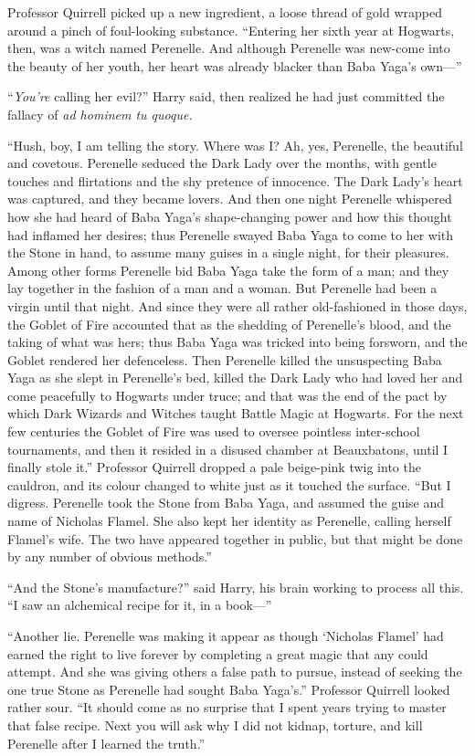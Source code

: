 Professor Quirrell picked up a new ingredient, a loose thread of gold wrapped around a pinch of foul-looking substance. “Entering her sixth year at Hogwarts, then, was a witch named Perenelle. And although Perenelle was new-come into the beauty of her youth, her heart was already blacker than Baba Yaga’s own—”

“\emph{You’re} calling her evil?” Harry said, then realized he had just committed the fallacy of \emph{ad hominem tu quoque.}

“Hush, boy, I am telling the story. Where was I? Ah, yes, Perenelle, the beautiful and covetous. Perenelle seduced the Dark Lady over the months, with gentle touches and flirtations and the shy pretence of innocence. The Dark Lady’s heart was captured, and they became lovers. And then one night Perenelle whispered how she had heard of Baba Yaga’s shape-changing power and how this thought had inflamed her desires; thus Perenelle swayed Baba Yaga to come to her with the Stone in hand, to assume many guises in a single night, for their pleasures. Among other forms Perenelle bid Baba Yaga take the form of a man; and they lay together in the fashion of a man and a woman. But Perenelle had been a virgin until that night. And since they were all rather old-fashioned in those days, the Goblet of Fire accounted that as the shedding of Perenelle’s blood, and the taking of what was hers; thus Baba Yaga was tricked into being forsworn, and the Goblet rendered her defenceless. Then Perenelle killed the unsuspecting Baba Yaga as she slept in Perenelle’s bed, killed the Dark Lady who had loved her and come peacefully to Hogwarts under truce; and that was the end of the pact by which Dark Wizards and Witches taught Battle Magic at Hogwarts. For the next few centuries the Goblet of Fire was used to oversee pointless inter-school tournaments, and then it resided in a disused chamber at Beauxbatons, until I finally stole it.” Professor Quirrell dropped a pale beige-pink twig into the cauldron, and its colour changed to white just as it touched the surface. “But I digress. Perenelle took the Stone from Baba Yaga, and assumed the guise and name of Nicholas Flamel. She also kept her identity as Perenelle, calling herself Flamel’s wife. The two have appeared together in public, but that might be done by any number of obvious methods.”

“And the Stone’s manufacture?” said Harry, his brain working to process all this. “I saw an alchemical recipe for it, in a book—”

“Another lie. Perenelle was making it appear as though ‘Nicholas Flamel’ had earned the right to live forever by completing a great magic that any could attempt. And she was giving others a false path to pursue, instead of seeking the one true Stone as Perenelle had sought Baba Yaga’s.” Professor Quirrell looked rather sour. “It should come as no surprise that I spent years trying to master that false recipe. Next you will ask why I did not kidnap, torture, and kill Perenelle after I learned the truth.”

